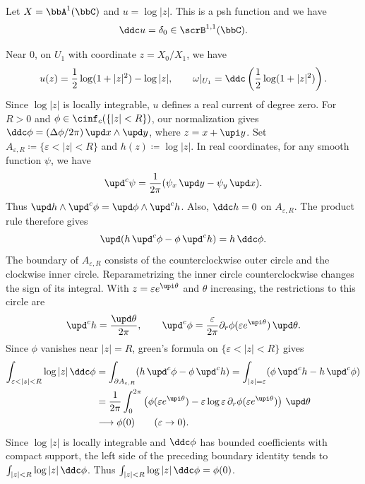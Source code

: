 \begin{example}[label=\labelNFM{eg:ddc-of-log-z}, status=draft, tag=0000000]
	Let $X = \bbA^1(\bbC)$ and $u = \log |z|$.
	This is a psh function and we have 
	\[ \ddc u = \delta_0 \in \scrB^{1,1}(\bbC). \]

	\Yang{}
  Near $0$, on $U_1$ with coordinate $z = X_0/X_1$, we have
  \[ u(z) = \frac{1}{2} \log(1 + |z|^2) - \log|z|, \qquad \omega|_{U_1} = \ddc\left(\frac{1}{2} \log(1 + |z|^2)\right). \]
  Since $\log|z|$ is locally integrable, $u$ defines a real current of degree zero.
  For $R > 0$ and $\phi \in \cinf_c(\{|z| < R\})$,
  our normalization gives $\ddc\phi = (\Delta\phi/2\pi)\,\upd x \wedge \upd y$, where $z = x + \upi y$.
  Set $A_{\varepsilon,R} \coloneqq \{\varepsilon < |z| < R\}$ and $h(z) \coloneqq \log|z|$.
  In real coordinates, for any smooth function $\psi$, we have
    \[ \upd^c\psi = \frac{1}{2\pi}(\psi_x\,\upd y - \psi_y\,\upd x). \]
    Thus $\upd h \wedge \upd^c\phi = \upd\phi \wedge \upd^c h$.
    Also, $\ddc h = 0$ on $A_{\varepsilon,R}$.
    The product rule therefore gives
    \[ \upd(h\,\upd^c\phi - \phi\,\upd^c h) = h\,\ddc\phi. \]
    The boundary of $A_{\varepsilon,R}$ consists of the counterclockwise outer circle and the clockwise inner circle.
    Reparametrizing the inner circle counterclockwise changes the sign of its integral.
    With $z = \varepsilon e^{\upi\theta}$ and $\theta$ increasing, the restrictions to this circle are
    \[ \upd^c h = \frac{\upd\theta}{2\pi}, \qquad \upd^c\phi = \frac{\varepsilon}{2\pi}\partial_r\phi(\varepsilon e^{\upi\theta})\,\upd\theta. \]
  Since $\phi$ vanishes near $|z| = R$,
  green's formula on $\{\varepsilon < |z| < R\}$ gives
  \begin{align*}
    \int_{\varepsilon < |z| < R} \log|z|\,\ddc\phi & = \int_{\partial A_{\varepsilon,R}} (h\,\upd^c\phi - \phi\,\upd^c h) = \int_{|z| = \varepsilon} (\phi\,\upd^c h - h\,\upd^c\phi) \\
    & = \frac{1}{2\pi} \int_0^{2\pi} \left(\phi(\varepsilon e^{\upi\theta}) - \varepsilon \log\varepsilon\,\partial_r\phi(\varepsilon e^{\upi\theta})\right)\,\upd\theta \\
    & \longrightarrow \phi(0) \qquad (\varepsilon \to 0).
  \end{align*}
  Since $\log|z|$ is locally integrable and $\ddc\phi$ has bounded coefficients with compact support,
  the left side of the preceding boundary identity tends to $\int_{|z| < R}\log|z|\,\ddc\phi$.
  Thus $\int_{|z| < R}\log|z|\,\ddc\phi = \phi(0)$.

	\Yang{}
\end{example}

